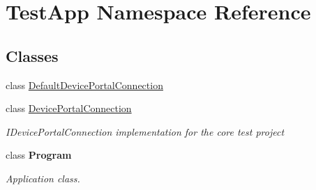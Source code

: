 \hypertarget{namespace_test_app}{}\section{Test\+App Namespace Reference}
\label{namespace_test_app}
\subsection*{Classes}
\begin{DoxyCompactItemize}
\item 
class \hyperlink{class_test_app_1_1_default_device_portal_connection}{Default\+Device\+Portal\+Connection}
\item 
class \hyperlink{class_test_app_1_1_device_portal_connection}{Device\+Portal\+Connection}
\begin{DoxyCompactList}\small\item\em I\+Device\+Portal\+Connection implementation for the core test project \end{DoxyCompactList}\item 
class {\bfseries Program}
\begin{DoxyCompactList}\small\item\em Application class. \end{DoxyCompactList}\end{DoxyCompactItemize}
